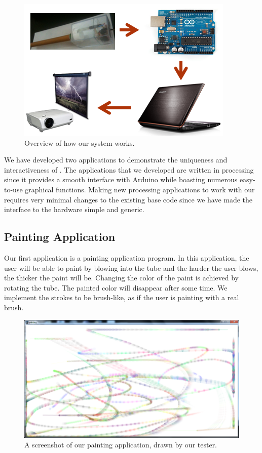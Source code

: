 \begin{figure}
  \centering
  \includegraphics[width=0.8\linewidth]{./figs/sketch.png}
  \caption{Overview of how our system works.}
  \label{fig:design-sketch}
\end{figure}

We have developed two applications to demonstrate the uniqueness and interactiveness of \tube. The applications that we developed are written in processing since it provides a smooth interface with Arduino while boasting numerous easy-to-use graphical functions. Making new processing applications to work with our \tube requires very minimal changes to the existing base code since we have made the interface to the hardware simple and generic.

\subsection{\textbf{Painting Application}}

Our first application is a painting application program. In this application, the user will be able to paint by blowing into the tube and the harder the user blows, the thicker the paint will be. Changing the color of the paint is achieved by rotating the tube. The painted color will disappear after some time. We implement the strokes to be brush-like, as if the user is painting with a real brush.
\begin{figure}
  \centering
  \includegraphics[width=\linewidth]{./figs/tube3.png}
  \caption{A screenshot of our painting application, drawn by our tester.}
  \label{fig:painting}
\end{figure}

